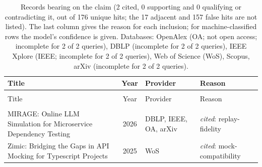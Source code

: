 
\begingroup\footnotesize
\begin{longtable}{@{}%
  >{\raggedright\arraybackslash}p{}c%
  >{\raggedright\arraybackslash}p{}%
  >{\raggedright\arraybackslash}p{}@{}}
\caption{Records bearing on the claim (2 cited, 0 supporting and 0 qualifying or contradicting it, out of 176 unique hits; the 17 adjacent and 157 false hits are not listed). The last column gives the reason for each inclusion; for machine-classified rows the model's confidence is given. Databases: OpenAlex (OA; not open access; incomplete for 2 of 2 queries), DBLP (incomplete for 2 of 2 queries), IEEE Xplore (IEEE; incomplete for 2 of 2 queries), Web of Science (WoS), Scopus, arXiv (incomplete for 2 of 2 queries).}\label{tab:t-verified-fakes}\\
\toprule
Title & Year & Provider & Reason \\
\midrule
\endfirsthead
\multicolumn{4}{@{}l}{\emph{\tablename~\thetable{} (cont.)}}\\
\toprule
Title & Year & Provider & Reason \\
\midrule
\endhead
\midrule \multicolumn{4}{r@{}}{\emph{continued on next page}}\\
\endfoot
\bottomrule
\endlastfoot
MIRAGE: Online LLM Simulation for Microservice Dependency Testing & 2026 & DBLP, IEEE, OA, arXiv & \emph{cited}: replay-fidelity \\
Zimic: Bridging the Gaps in API Mocking for Typescript Projects & 2025 & WoS & \emph{cited}: mock-compatibility \\
\end{longtable}
\endgroup
